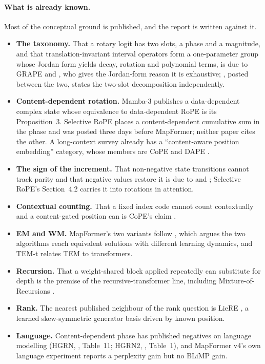\documentclass[10pt]{article}
\begin{document}
\paragraph{What is already known.} Most of the conceptual ground is published, and the report is
written against it.
\begin{itemize}
\item \textbf{The taxonomy.} That a rotary logit has two slots, a phase and a magnitude, and that
translation-invariant interval operators form a one-parameter group whose Jordan form yields decay,
rotation and polynomial terms, is due to GRAPE \citep{zhang2026grape} and \citet{puranik2026group}, who
gives the Jordan-form reason it is exhaustive; \citet{vetcha2026infinite}, posted between the two, states the
two-slot decomposition independently.
\item \textbf{Content-dependent rotation.} Mamba-3 \citep{lahoti2026mamba3} publishes a
data-dependent complex state whose equivalence to data-dependent RoPE is its Proposition~3.
Selective RoPE \citep{movahedi2026srope} places a content-dependent cumulative sum in the phase and
was posted three days before MapFormer; neither paper cites the other. A long-context survey
\citep{liu2025survey} already has a ``content-aware position embedding'' category, whose members
are CoPE \citep{golovneva2024cope} and DAPE \citep{zheng2024dape}.
\item \textbf{The sign of the increment.} That non-negative state transitions cannot track parity
and that negative values restore it is due to \citet{sarrof2024expressive} and
\citet{grazzi2025unlocking}; Selective RoPE's Section~4.2 carries it into rotations in attention.
\item \textbf{Contextual counting.} That a fixed index code cannot count contextually and a
content-gated position can is CoPE's claim \citep{golovneva2024cope}.
\item \textbf{EM and WM.} MapFormer's two variants follow \citet{whittington2025tale}, which argues
the two algorithms reach equivalent solutions with different learning dynamics, and TEM-t
\citep{whittington2022temt} relates TEM to transformers.
\item \textbf{Recursion.} That a weight-shared block applied repeatedly can substitute for depth is
the premise of the recursive-transformer line, including Mixture-of-Recursions \citep{bae2025mor}.
\item \textbf{Rank.} The nearest published neighbour of the rank question is LieRE
\citep{ostmeier2025liere}, a learned skew-symmetric generator basis driven by known position.
\item \textbf{Language.} Content-dependent phase has published negatives on language modelling
(HGRN, \citealp{qin2023hgrn}, Table~11; HGRN2, \citealp{qin2024hgrn2}, Table~1), and MapFormer v4's
own language experiment reports a perplexity gain but no BLiMP gain.
\end{itemize}
\end{document}
